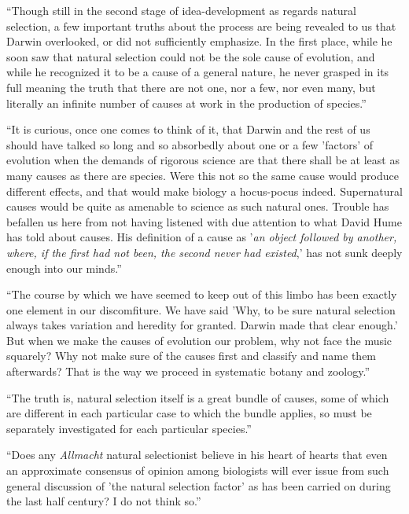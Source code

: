 \documentclass[a4paper, 11pt, oneside, polutonikogreek, english, landscape]{article}
\begin{document}
``Though still in the second stage of idea-development as regards natural selection, a few important truths about the process are being revealed to us that Darwin overlooked, or did not sufficiently emphasize. In the first place, while he soon saw that natural selection could not be the sole cause of evolution, and while he recognized it to be a cause of a general nature, he never grasped in its full meaning the truth that there are not one, nor a few, nor even many, but literally an infinite number of causes at work in the production of species.''

``It is curious, once one comes to think of it, that Darwin and the rest of us should have talked so long and so absorbedly about one or a few 'factors' of evolution when the demands of rigorous science are that there shall be at least as many causes as there are species. Were this not so the same cause would produce different effects, and that would make biology a hocus-pocus indeed. Supernatural causes would be quite as amenable to science as such natural ones. Trouble has befallen us here from not having listened with due attention to what David Hume has told about causes. His definition of a cause as '\emph{an object followed by another, where, if the first had not been, the second never had existed},' has not sunk deeply enough into our minds.''

``The course by which we have seemed to keep out of this limbo has been exactly one element in our discomfiture. We have said 'Why, to be sure natural selection always takes variation and heredity for granted. Darwin made that clear enough.' But when we make the causes of evolution our problem, why not face the music squarely? Why not make sure of the causes first and classify and name them afterwards? That is the way we proceed in systematic botany and zoology.''

``The truth is, natural selection itself is a great bundle of causes, some of which are different in each particular case to which the bundle applies, so must be separately investigated for each particular species.''

``Does any \emph{Allmacht} natural selectionist believe in his heart of hearts that even an approximate consensus of opinion among biologists will ever issue from such general discussion of 'the natural selection factor' as has been carried on during the last half century? I do not think so.''
\end{document}
